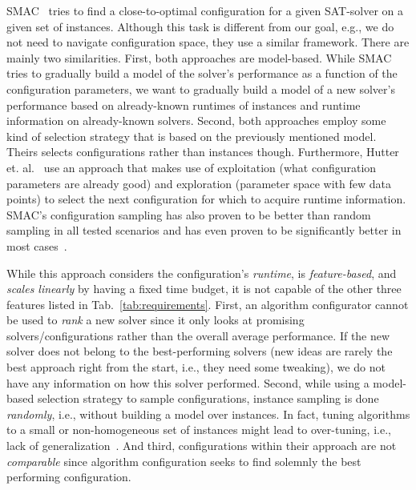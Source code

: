 \documentclass[runningheads]{llncs}
\begin{document}
SMAC~\cite{HutterHL11} tries to find a close-to-optimal configuration for a given SAT-solver on a given set of instances.
Although this task is different from our goal, e.g., we do not need to navigate configuration space, they use a similar framework.
There are mainly two similarities.
First, both approaches are model-based.
While SMAC tries to gradually build a model of the solver's performance as a function of the configuration parameters, we want to gradually build a model of a new solver's performance based on already-known runtimes of instances and runtime information on already-known solvers.
Second, both approaches employ some kind of selection strategy that is based on the previously mentioned model.
Theirs selects configurations rather than instances though.
Furthermore, Hutter et. al.~\cite{HutterHL11} use an approach that makes use of exploitation (what configuration parameters are already good) and exploration (parameter space with few data points) to select the next configuration for which to acquire runtime information.
SMAC's configuration sampling has also proven to be better than random sampling in all tested scenarios and has even proven to be significantly better in most cases~\cite{HutterHL11}.

While this approach considers the configuration's \emph{runtime}, is \emph{feature-based}, and \emph{scales linearly} by having a fixed time budget, it is not capable of the other three features listed in Tab.~\ref{tab:requirements}.
First, an algorithm configurator cannot be used to \emph{rank} a new solver since it only looks at promising solvers/configurations rather than the overall average performance.
If the new solver does not belong to the best-performing solvers (new ideas are rarely the best approach right from the start, i.e., they need some tweaking), we do not have any information on how this solver performed.
Second, while using a model-based selection strategy to sample configurations, instance sampling is done \emph{randomly}, i.e., without building a model over instances.
In fact, tuning algorithms to a small or non-homogeneous set of instances might lead to over-tuning, i.e., lack of generalization~\cite{eggensperger2019pitfalls}.
And third, configurations within their approach are not \emph{comparable} since algorithm configuration seeks to find solemnly the best performing configuration.
\end{document}
